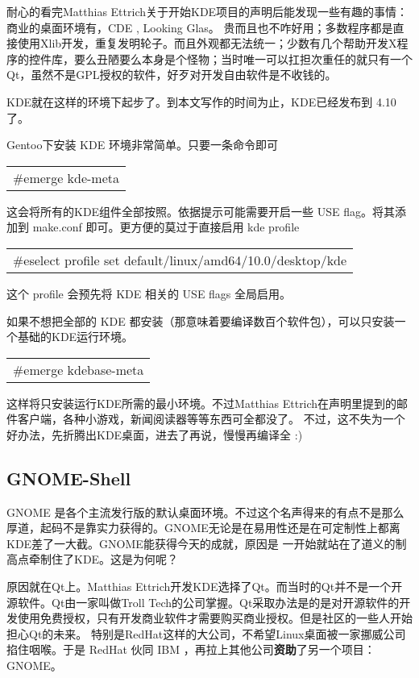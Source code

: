 \documentclass[amstex,twoside]{ctexbook}
\newenvironment{code}{\small\tt\begin{longtable}{p{0.8\textwidth}}}{\end{longtable}}
\begin{document}
耐心的看完{}Matthias Ettrich{}关于开始KDE项目的声明后能发现一些有趣的事情：
商业的桌面环境有，CDE , Looking Glas。 贵而且也不咋好用；多数程序都是直接使用Xlib开发，重复发明轮子。而且外观都无法统一；少数有几个帮助开发X程序的控件库，要么丑陋要么本身是个怪物；当时唯一可以扛担次重任的就只有一个Qt，虽然不是GPL授权的软件，好歹对开发自由软件是不收钱的。

KDE就在这样的环境下起步了。到本文写作的时间为止，KDE已经发布到 4.10了。

Gentoo下安装 KDE 环境非常简单。只要一条命令即可

\begin{code}
\#emerge kde-meta
\end{code}

这会将所有的KDE组件全部按照。依据提示可能需要开启一些 USE flag。将其添加到 make.conf 即可。更方便的莫过于直接启用 kde profile

\begin{code}
\#eselect profile  set default/linux/amd64/10.0/desktop/kde
\end{code}

这个 profile 会预先将 KDE 相关的 USE flags 全局启用。

如果不想把全部的 KDE 都安装（那意味着要编译数百个软件包），可以只安装一个基础的KDE运行环境。 

\begin{code}
\#emerge kdebase-meta
\end{code}

这样将只安装运行KDE所需的最小环境。不过{}Matthias Ettrich{}在声明里提到的邮件客户端，各种小游戏，新闻阅读器等等东西可全都没了。
不过，这不失为一个好办法，先折腾出KDE桌面，进去了再说，慢慢再编译全 :) 


\subsection{GNOME-Shell}

GNOME 是各个主流发行版的默认桌面环境。不过这个名声得来的有点不是那么厚道，起码不是靠实力获得的。GNOME无论是在易用性还是在可定制性上都离KDE差了一大截。GNOME能获得今天的成就，原因是
一开始就站在了道义的制高点牵制住了KDE。这是为何呢？

原因就在Qt上。{}Matthias Ettrich{}开发KDE选择了Qt。而当时的Qt并不是一个开源软件。Qt由一家叫做Troll Tech的公司掌握。Qt采取办法是的是对开源软件的开发使用免费授权，只有开发商业软件才需要购买商业授权。但是社区的一些人开始担心Qt的未来。
特别是RedHat这样的大公司，不希望Linux桌面被一家挪威公司掐住咽喉。于是 RedHat 伙同 IBM ，再拉上其他公司\textbf{资助}了另一个项目：GNOME。
\end{document}
